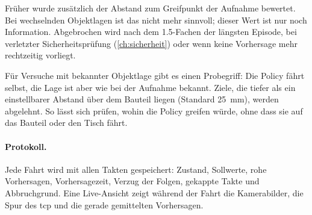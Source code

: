 Früher wurde zusätzlich der Abstand zum Greifpunkt der Aufnahme bewertet. Bei wechselnden
Objektlagen ist das nicht mehr sinnvoll; dieser Wert ist nur noch Information. Abgebrochen
wird nach dem \num{1.5}-Fachen der längsten Episode, bei verletzter Sicherheitsprüfung
(\cref{ch:sicherheit}) oder wenn keine Vorhersage mehr rechtzeitig vorliegt.

Für Versuche mit bekannter Objektlage gibt es einen Probegriff: Die Policy fährt selbst, die
Lage ist aber wie bei der Aufnahme bekannt. Ziele, die tiefer als ein einstellbarer Abstand
über dem Bauteil liegen (Standard \SI{25}{\milli\metre}), werden abgelehnt. So lässt sich
prüfen, wohin die Policy greifen würde, ohne dass sie auf das Bauteil oder den Tisch fährt.

\paragraph{Protokoll.} Jede Fahrt wird mit allen Takten gespeichert: Zustand, Sollwerte, rohe
Vorhersagen, Vorhersagezeit, Verzug der Folgen, gekappte Takte und Abbruchgrund. Eine
Live-Ansicht zeigt während der Fahrt die Kamerabilder, die Spur des \ac{tcp} und die gerade
gemittelten Vorhersagen.
